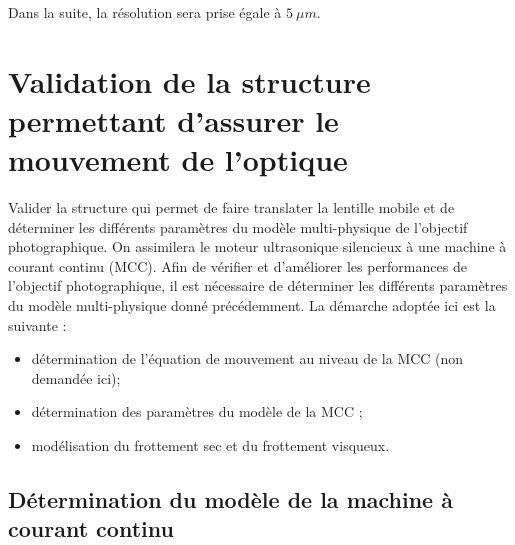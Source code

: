 \ifprof
\begin{corrige}
\end{corrige}
\else
\fi


Dans la suite, la résolution sera prise égale à $\SI{5}{\mu m}$.

\ifprof
\begin{corrige}
\end{corrige}
\else
\fi



\section{Validation de la structure permettant d'assurer le mouvement de l'optique}\label{validation-de-la-structure-permettant-dassurer-le-mouvement-de-loptique}

\begin{obj}
Valider la structure qui permet de faire translater la lentille mobile
et de déterminer les différents paramètres du modèle multi-physique de
l'objectif photographique. On assimilera le moteur ultrasonique silencieux à une machine à courant continu (MCC).
Afin de vérifier et d'améliorer les performances de l'objectif
photographique, il est nécessaire de déterminer les différents
paramètres du modèle multi-physique donné précédemment. La démarche
adoptée ici est la suivante :

\begin{itemize}
\item
  détermination de l'équation de mouvement au niveau de la MCC (non demandée ici);
\item
  détermination des paramètres du modèle de la MCC ;
\item
  modélisation du frottement sec et du frottement visqueux.
  \end{itemize}
\end{obj}

\subsection{Détermination du modèle de la machine à courant continu}

